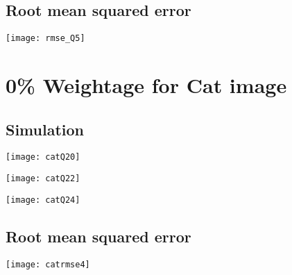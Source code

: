 \documentclass[a4paper, 12pt]{article}
\begin{document}
\subsection{Root mean squared error}

\begin{center}
\begin{minipage}{0.7\linewidth}
    \texttt{[image: rmse\_Q5]}
    \label{fig:Q1_3}
\end{minipage}
\end{center}

\section{0\% Weightage for Cat image}

\subsection{Simulation}
\begin{center}
\begin{minipage}{0.45\linewidth}
    \texttt{[image: catQ20]}
    \label{fig:Q1_1}
\end{minipage}
\hfill
\begin{minipage}{0.45\linewidth}
    \texttt{[image: catQ22]}
    \label{fig:Q1_2}
\end{minipage}
\vspace{1.5 em}

\begin{minipage}{0.45\linewidth}
    \texttt{[image: catQ24]}
    \label{fig:Q1_2}
\end{minipage}
\vspace{1.5 em}
\end{center}

\subsection{Root mean squared error}

\begin{center}
\begin{minipage}{0.5\linewidth}
    \texttt{[image: catrmse4]}
    \label{fig:Q1_3}
\end{minipage}
\end{center}
\end{document}
